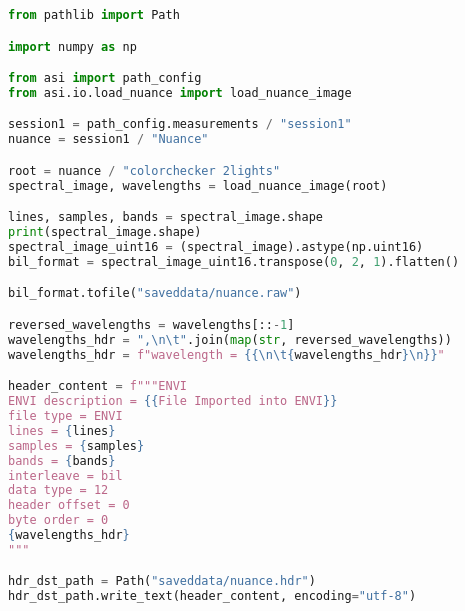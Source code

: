 \begin{lstlisting}[language=python, caption=Save nuance image as ENVI format, label={code:save-nuance}]
from pathlib import Path

import numpy as np

from asi import path_config
from asi.io.load_nuance import load_nuance_image

session1 = path_config.measurements / "session1"
nuance = session1 / "Nuance"

root = nuance / "colorchecker 2lights"
spectral_image, wavelengths = load_nuance_image(root)

lines, samples, bands = spectral_image.shape
print(spectral_image.shape)
spectral_image_uint16 = (spectral_image).astype(np.uint16)
bil_format = spectral_image_uint16.transpose(0, 2, 1).flatten()

bil_format.tofile("saveddata/nuance.raw")

reversed_wavelengths = wavelengths[::-1]
wavelengths_hdr = ",\n\t".join(map(str, reversed_wavelengths))
wavelengths_hdr = f"wavelength = {{\n\t{wavelengths_hdr}\n}}"

header_content = f"""ENVI
ENVI description = {{File Imported into ENVI}}
file type = ENVI
lines = {lines}
samples = {samples}
bands = {bands}
interleave = bil
data type = 12
header offset = 0
byte order = 0
{wavelengths_hdr}
"""

hdr_dst_path = Path("saveddata/nuance.hdr")
hdr_dst_path.write_text(header_content, encoding="utf-8")
\end{lstlisting}
